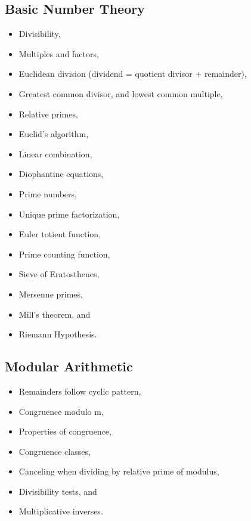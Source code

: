 \hypertarget{basic-number-theory}{%
\subsection{Basic Number Theory}\label{basic-number-theory}}

\begin{itemize}
\tightlist
\item
  Divisibility,
\item
  Multiples and factors,
\item
  Euclidean division (dividend = quotient divisor + remainder),
\item
  Greatest common divisor, and lowest common multiple,
\item
  Relative primes,
\item
  Euclid's algorithm,
\item
  Linear combination,
\item
  Diophantine equations,
\item
  Prime numbers,
\item
  Unique prime factorization,
\item
  Euler totient function,
\item
  Prime counting function,
\item
  Sieve of Eratosthenes,
\item
  Mersenne primes,
\item
  Mill's theorem, and
\item
  Riemann Hypothesis.
\end{itemize}

\hypertarget{modular-arithmetic}{%
\subsection{Modular Arithmetic}\label{modular-arithmetic}}

\begin{itemize}
\tightlist
\item
  Remainders follow cyclic pattern,
\item
  Congruence modulo m,
\item
  Properties of congruence,
\item
  Congruence classes,
\item
  Canceling when dividing by relative prime of modulus,
\item
  Divisibility tests, and
\item
  Multiplicative inverses.
\end{itemize}

